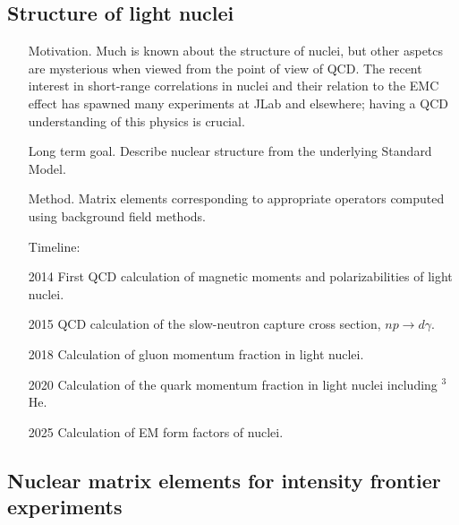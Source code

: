\documentclass{article}
\begin{document}
\subsection{Structure of light nuclei}

\begin{itemize}  
    \item[Motivation.] Much is known about the structure of nuclei, but other aspetcs are mysterious when viewed from the point of view of QCD. The recent interest in short-range correlations in nuclei and their relation to the EMC effect has spawned many experiments at JLab and elsewhere; having a QCD understanding of this physics is crucial. 
    
    \item[Long term goal.] Describe nuclear structure from the underlying Standard Model. 
    
    \item[Method.] Matrix elements corresponding to appropriate operators computed using background field methods.
      
\item[Timeline:]
    \item[2014] First QCD calculation of magnetic moments and polarizabilities of light nuclei.
    \item[2015] QCD calculation of the slow-neutron capture cross section, $np\to d\gamma$.
\item[2018] Calculation of gluon momentum fraction in light nuclei.
    \item[2020] Calculation of the quark momentum fraction in light nuclei including $^3$He. 
    \item[2025] Calculation of EM form factors of nuclei.
\end{itemize}

\subsection{Nuclear matrix elements for intensity frontier experiments}
\end{document}
